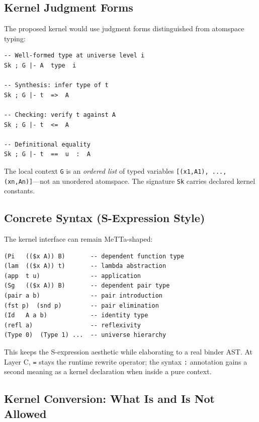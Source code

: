 \documentclass[11pt]{article}
\newcommand{\code}[1]{\texttt{#1}}
\begin{document}
\subsection{Kernel Judgment Forms}

The proposed kernel would use judgment forms distinguished from atomspace typing:

\begin{lstlisting}[language={},caption={Proposed dependent-kernel judgment forms}]
-- Well-formed type at universe level i
Sk ; G |- A  type  i

-- Synthesis: infer type of t
Sk ; G |- t  =>  A

-- Checking: verify t against A
Sk ; G |- t  <=  A

-- Definitional equality
Sk ; G |- t  ==  u  :  A
\end{lstlisting}

The local context \code{G} is an \emph{ordered list} of typed variables
\code{[(x1,A1), ..., (xn,An)]}---not an unordered atomspace.
The signature \code{Sk} carries declared kernel constants.

\subsection{Concrete Syntax (S-Expression Style)}

The kernel interface can remain MeTTa-shaped:

\begin{lstlisting}[language={},caption={Proposed dependent-kernel source forms}]
(Pi   (($x A)) B)       -- dependent function type
(lam  (($x A)) t)       -- lambda abstraction
(app  t u)              -- application
(Sg   (($x A)) B)       -- dependent pair type
(pair a b)              -- pair introduction
(fst p)  (snd p)        -- pair elimination
(Id   A a b)            -- identity type
(refl a)                -- reflexivity
(Type 0)  (Type 1) ...  -- universe hierarchy
\end{lstlisting}

This keeps the S-expression aesthetic while elaborating to a real binder AST.
At Layer C, \code{=} stays the runtime rewrite operator; the syntax \code{:}
annotation gains a second meaning as a kernel declaration when inside a
pure context.

\subsection{Kernel Conversion: What Is and Is Not Allowed}
\end{document}
